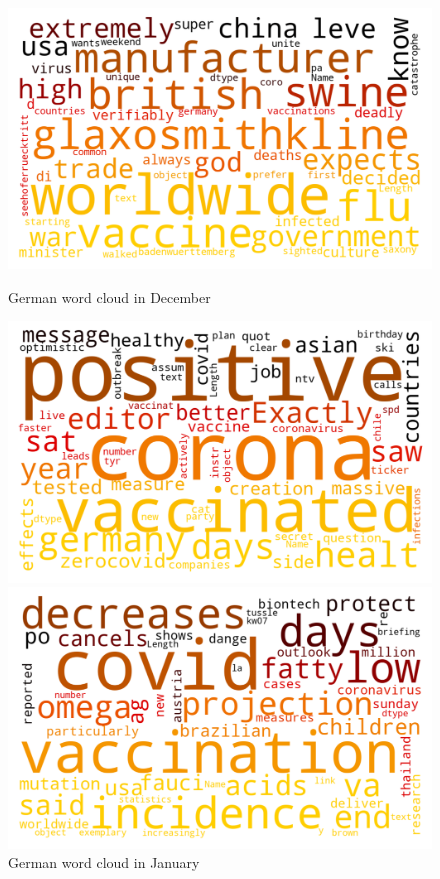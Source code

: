 \begin{landscape}
\newpage

\begin{figure}[!htb]
  \includegraphics[width=\linewidth]{December de word cloud.png}
  \caption{German word cloud in December}\label{fig:decemberde}
\endminipage\hfill
{}
  \includegraphics[width=\linewidth]{January de word cloud.png}
  \caption{German word cloud in January}\label{fig:januaryde}
\endminipage\hfill
{}
  \includegraphics[width=\linewidth]{February de word cloud.png}

\end{figure}
\end{landscape}
